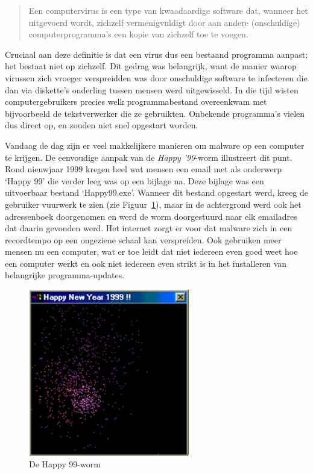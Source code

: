 \begin{quotation}
Een computervirus is een type van kwaadaardige software dat, wanneer het uitgevoerd wordt, zichzelf vermenigvuldigt door aan andere (onschuldige) computerprogramma's een kopie van zichzelf toe te voegen.
\end{quotation}

Cruciaal aan deze definitie is dat een virus dus een bestaand programma aanpast; het bestaat niet op zichzelf. Dit gedrag was belangrijk, want de manier waarop virussen zich vroeger verspreidden was door onschuldige software te infecteren die dan via diskette's onderling tussen mensen werd uitgewisseld. In die tijd wisten computergebruikers precies welk programmabestand overeenkwam met bijvoorbeeld de tekstverwerker die ze gebruikten. Onbekende programma's vielen dus direct op, en zouden niet snel opgestart worden.

Vandaag de dag zijn er veel makkelijkere manieren om malware op een computer te krijgen. De eenvoudige aanpak van de \emph{Happy '99}-worm illustreert dit punt. Rond nieuwjaar 1999 kregen heel wat mensen een email met als onderwerp `Happy 99' die verder leeg was op een bijlage na. Deze bijlage was een uitvoerbaar bestand `Happy99.exe'. Wanneer dit bestand opgestart werd, kreeg de gebruiker vuurwerk te zien (zie Figuur~\ref{happy99}), maar in de achtergrond werd ook het adressenboek doorgenomen en werd de worm doorgestuurd naar elk emailadres dat daarin gevonden werd. Het internet zorgt er voor dat malware zich in een recordtempo op een ongeziene schaal kan verspreiden. Ook gebruiken meer mensen nu een computer, wat er toe leidt dat niet iedereen even goed weet hoe een computer werkt en ook niet iedereen even strikt is in het installeren van belangrijke programma-updates.

\begin{figure}
\begin{center}
\includegraphics[width=70mm]{images/happy99.png}
\end{center}
\caption{De Happy 99-worm}
\label{happy99}
\end{figure}


